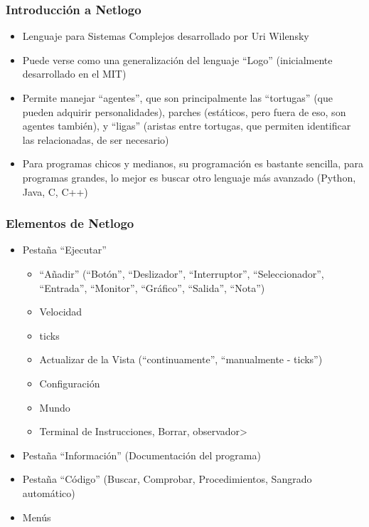 \documentclass{beamer}
\begin{document}
\begin{frame}[t]
\frametitle{Introducción a Netlogo}
\begin{itemize}[<+->]
	\item Lenguaje para Sistemas Complejos desarrollado por Uri Wilensky
	\item Puede verse como una generalización del lenguaje ``Logo'' (inicialmente desarrollado en el MIT)
	\item Permite manejar ``agentes'', que son principalmente las ``tortugas'' (que pueden adquirir personalidades), parches (estáticos, pero fuera de eso, son agentes también), y ``ligas'' (aristas entre tortugas, que permiten identificar las relacionadas, de ser necesario)
	\item Para programas chicos y medianos, su programación es bastante sencilla, para programas grandes, lo mejor es buscar otro lenguaje más avanzado (Python, Java, C, C++)
\end{itemize}

\end{frame}

\begin{frame}[t]
\frametitle{Elementos de Netlogo}
\begin{itemize}[<+->]
	\item Pestaña ``Ejecutar''
	\begin{itemize}[<+->]
	\item ``Añadir'' (``Botón'', ``Deslizador'', ``Interruptor'', ``Seleccionador'', ``Entrada'', ``Monitor'', ``Gráfico'', ``Salida'', ``Nota'')
	\item Velocidad
	\item ticks
	\item Actualizar de la Vista (``continuamente'', ``manualmente - ticks'')
	\item Configuración
	\item Mundo
	\item Terminal de Instrucciones, Borrar, observador>
	\end{itemize}
	\item Pestaña ``Información'' (Documentación del programa)
	\item Pestaña ``Código'' (Buscar, Comprobar, Procedimientos, Sangrado automático)
	\item Menús
\end{itemize}
\end{frame}
\end{document}

